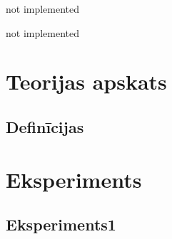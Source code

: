 \documentclass[singlespacing, latexmargins]{ludis}
\begin{document}
\maketitle

\begin{abstract-lv}
    not implemented

\end{abstract-lv}

\begin{abstract-en}
    not implemented

\end{abstract-en}

\tableofcontents





\chapter{Teorijas apskats}


\section{Definīcijas}


\chapter{Eksperiments}


\section{Eksperiments1}







% 


% 
\end{document}
